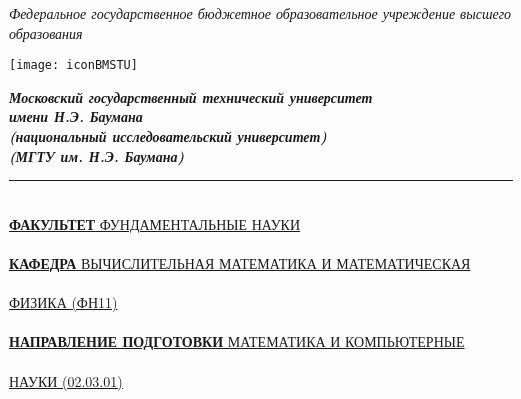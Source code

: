 \normalsize

\newcommand{\printTask}{%
    \ifthenelse{\equal{\task}{lab}}{%
        лабораторной%
    }{%
        \ifthenelse{\equal{\task}{hw}}{%
            домашней%
        }{%
            Неизвестный тип задания%
        }%
    }%
}

\begin{titlepage}

    \begin{center}
        {\footnotesize \itshape Федеральное государственное бюджетное 
                       образовательное учреждение высшего образования}
    \end{center}

    \begin{minipage}[c]{0.1\textwidth}
        \texttt{[image: iconBMSTU]}
    \end{minipage}
    \hfill
    \begin{minipage}[c]{0.9\textwidth}
        \centering
        \itshape
        \bfseries
        \small
        \guillemotleft Московский государственный технический университет \\
        имени Н.Э. Баумана\guillemotright \\
        (национальный исследовательский университет) \\
        (МГТУ им. Н.Э. Баумана) 
    \end{minipage}

    \vspace{0.5cm}
    \noindent\rule{\textwidth}{2pt} \\

    \noindent\uline{\textbf{ФАКУЛЬТЕТ} ФУНДАМЕНТАЛЬНЫЕ НАУКИ} \\
    \vspace{-5pt} \\
    \noindent\uline{\textbf{КАФЕДРА} ВЫЧИСЛИТЕЛЬНАЯ МАТЕМАТИКА И МАТЕМАТИЧЕСКАЯ} \\
    \vspace{-5pt} \\
    \noindent\uline{ФИЗИКА (ФН11)} \\
    \vspace{-5pt} \\
    \noindent\uline{\textbf{НАПРАВЛЕНИЕ ПОДГОТОВКИ} МАТЕМАТИКА И КОМПЬЮТЕРНЫЕ} \\
    \vspace{-5pt} \\
    \noindent\uline{НАУКИ (02.03.01)} \\


\end{titlepage}
